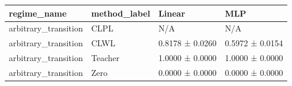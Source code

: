 \begin{tabular}{llll}
\toprule
regime_name & method_label & Linear & MLP \\
\midrule
arbitrary_transition & CLPL & N/A & N/A \\
arbitrary_transition & CLWL & 0.8178 ± 0.0260 & 0.5972 ± 0.0154 \\
arbitrary_transition & Teacher & 1.0000 ± 0.0000 & 1.0000 ± 0.0000 \\
arbitrary_transition & Zero & 0.0000 ± 0.0000 & 0.0000 ± 0.0000 \\
\bottomrule
\end{tabular}

